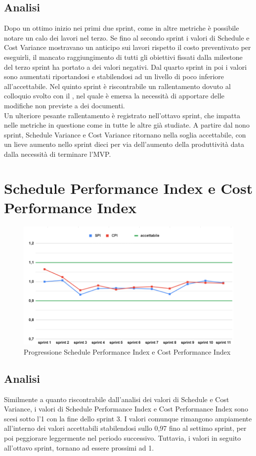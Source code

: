 \subsection{Analisi}
Dopo un ottimo inizio nei primi due sprint, come in altre metriche è possibile notare un calo dei lavori nel terzo. Se fino al secondo sprint i valori di Schedule e Cost Variance mostravano un anticipo sui lavori rispetto il costo preventivato per eseguirli, il mancato raggiungimento di tutti gli obiettivi fissati dalla milestone del terzo sprint ha portato a dei valori negativi. Dal quarto sprint in poi i valori sono aumentati riportandosi e stabilendosi ad un livello di poco inferiore all'accettabile. Nel quinto sprint è riscontrabile un rallentamento dovuto al colloquio svolto con il , nel quale è emersa la necessità di apportare delle modifiche non previste a dei documenti.\\
Un ulteriore pesante rallentamento è registrato nell'ottavo sprint, che impatta nelle metriche in questione come in tutte le altre già studiate. 
A partire dal nono sprint, Schedule Variance e Cost Variance ritornano nella soglia accettabile, con un lieve aumento nello sprint dieci per via dell'aumento della produttività data dalla necessità di terminare l'MVP.

\section{Schedule Performance Index e Cost Performance Index}
\begin{figure}[H]
    \centering
    \includegraphics[width=0.8\linewidth]{SPICPI.png}
    \caption{Progressione Schedule Performance Index e Cost Performance Index}
\end{figure}
\subsection{Analisi}
Similmente a quanto riscontrabile dall'analisi dei valori di Schedule e Cost Variance, i valori di Schedule Performance Index e Cost Performance Index sono scesi sotto l'1 con la fine dello sprint 3. I valori comunque rimangono ampiamente all'interno dei valori accettabili stabilendosi sullo 0,97 fino al settimo sprint, per poi peggiorare leggermente nel periodo successivo.
Tuttavia, i valori in seguito all'ottavo sprint, tornano ad essere prossimi ad 1.


